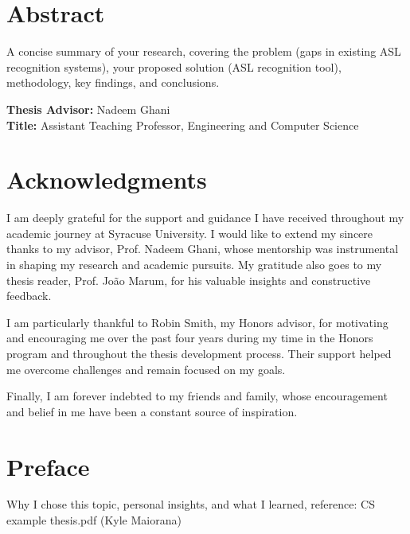 \documentclass[12pt]{article}
\begin{document}
\clearpage
\section*{Abstract}
\vspace{1em}

\noindent
A concise summary of your research, covering the problem (gaps in existing ASL recognition 
systems), your proposed solution (ASL recognition tool), methodology, key findings, and
conclusions. 

\vspace{2em}
\noindent
\textbf{Thesis Advisor:} Nadeem Ghani \\
\textbf{Title:} Assistant Teaching Professor, Engineering and Computer Science

\newpage
\mbox{}                
\newpage

\newpage
\doublespacing
\section*{Acknowledgments}

I am deeply grateful for the support and guidance I have received throughout my academic journey at Syracuse University. I would like to extend my sincere thanks to my advisor, Prof. Nadeem Ghani, whose mentorship was instrumental in shaping my research and academic pursuits. My gratitude also goes to my thesis reader, Prof. João Marum, for his valuable insights and constructive feedback.

I am particularly thankful to Robin Smith, my Honors advisor, for motivating and encouraging me over the past four years during my time in the Honors program and throughout the thesis development process. Their support helped me overcome challenges and remain focused on my goals.

Finally, I am forever indebted to my friends and family, whose encouragement and belief in me have been a constant source of inspiration.


\newpage
\doublespacing
\section*{Preface}

Why I chose this topic, personal insights, and what I learned, reference: CS example 
thesis.pdf (Kyle Maiorana)
\end{document}
